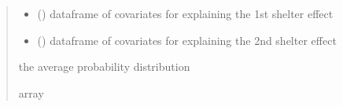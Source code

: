 \documentclass[letterpaper,10pt,english]{sphinxmanual}
\begin{document}
\begin{fulllineitems}
\begin{quote}
\begin{description}
\begin{itemize}
\item {} 
\sphinxAtStartPar
{} () \textendash{} dataframe of covariates for explaining the 1st shelter effect

\item {} 
\sphinxAtStartPar
{} () \textendash{} dataframe of covariates for explaining the 2nd shelter effect

\end{itemize}

\sphinxAtStartPar
the average probability distribution

\sphinxAtStartPar
array

\end{description}\end{quote}

\end{fulllineitems}

\end{document}

